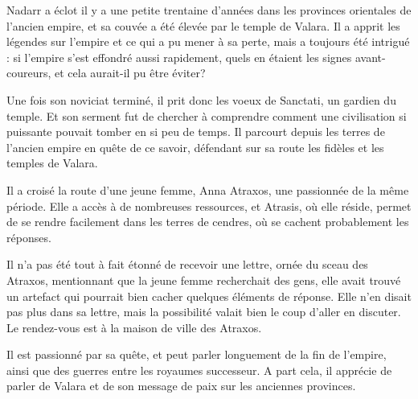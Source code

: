 \documentclass[10pt,a4paper]{article}
\begin{document}
Nadarr a éclot il y a une petite trentaine d'années dans les provinces orientales de l'ancien empire, et sa couvée a été élevée par le temple de Valara. Il a apprit les légendes sur l'empire et ce qui a pu mener à sa perte, mais a toujours été intrigué : si l'empire s'est effondré aussi rapidement, quels en étaient les signes avant-coureurs, et cela aurait-il pu être éviter?

Une fois son noviciat terminé, il prit donc les voeux de Sanctati, un gardien du temple. Et son serment fut de chercher à comprendre comment une civilisation si puissante pouvait tomber en si peu de temps. Il parcourt depuis les terres de l'ancien empire en quête de ce savoir, défendant sur sa route les fidèles et les temples de Valara.

Il a croisé la route d'une jeune femme, Anna Atraxos, une passionnée de la même période. Elle a accès à de nombreuses ressources, et Atrasis, où elle réside, permet de se rendre facilement dans les terres de cendres, où se cachent probablement les réponses.

Il n'a pas été tout à fait étonné de recevoir une lettre, ornée du sceau des Atraxos, mentionnant que la jeune femme recherchait des gens, elle avait trouvé un artefact qui pourrait bien cacher quelques éléments de réponse. Elle n'en disait pas plus dans sa lettre, mais la possibilité valait bien le coup d'aller en discuter. Le rendez-vous est à la maison de ville des Atraxos.

Il est passionné par sa quête, et peut parler longuement de la fin de l'empire, ainsi que des guerres entre les royaumes successeur. A part cela, il apprécie de parler de Valara et de son message de paix sur les anciennes provinces.
\end{document}
